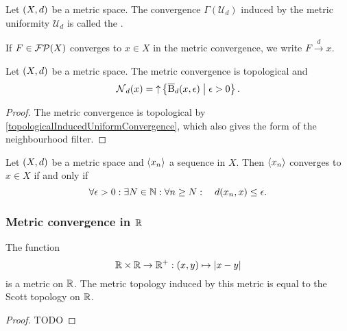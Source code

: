 \begin{definition}
Let $\left( X,d \right)$ be a metric space. The convergence $\Gamma(\mathcal{U}_d)$ induced by the metric uniformity $\mathcal{U}_d$ is called the .

If $F\in\operatorname{\mathcal{FP}}(X)$ converges to $x\in X$ in the metric convergence, we write $F\overset{d}{\longrightarrow} x$.
\end{definition}

\begin{lemma}
Let $\left( X,d \right)$ be a metric space. The metric convergence is topological and
\[ \operatorname{\mathcal{N}}_d(x) = \operatorname{\uparrow}\left\{ \operatorname{\overline{B}}_d(x,\epsilon) \;\middle|\; \epsilon >0 \right\}. \]
\end{lemma}
\begin{proof}
The metric convergence is topological by \ref{topologicalInducedUniformConvergence}, which also gives the form of the neighbourhood filter. 
\end{proof}
\begin{corollary}
Let $\left( X,d \right)$ be a metric space and $\left\langle x_n \right\rangle$ a sequence in $X$. Then $\left\langle x_n \right\rangle$ converges to $x\in X$ \textup{if and only if}
\[ \forall \epsilon>0: \exists N\in\mathbb{N}: \forall n\geq N: \quad d(x_n,x)\leq \epsilon. \]
\end{corollary}

\subsubsection{Metric convergence in $\mathbb{R}$}
\begin{lemma}
The function
\[ \mathbb{R}\times \mathbb{R}\to\mathbb{R}^+: (x,y) \mapsto |x-y| \]
is a metric on $\mathbb{R}$. The metric topology induced by this metric is equal to the Scott topology on $\mathbb{R}$.
\end{lemma}
\begin{proof}
TODO
\end{proof}

